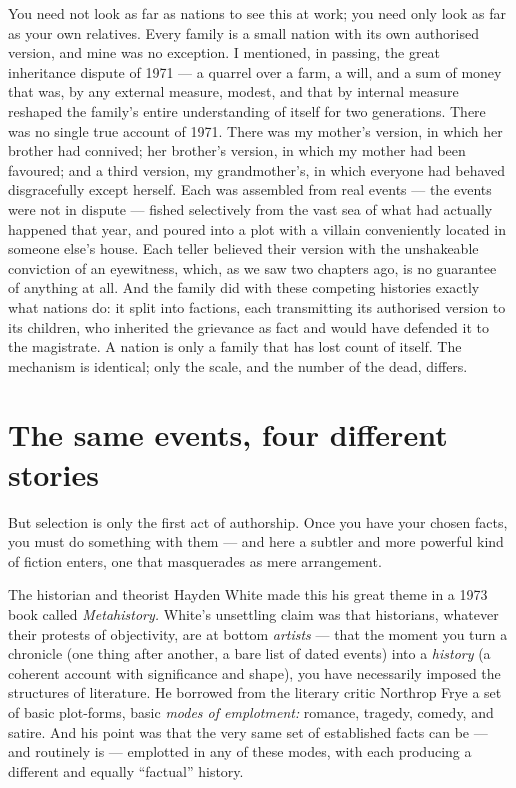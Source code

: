 You need not look as far as nations to see this at work; you need only look as far as your own relatives. Every family is a small nation with its own authorised version, and mine was no exception. I mentioned, in passing, the great inheritance dispute of 1971 — a quarrel over a farm, a will, and a sum of money that was, by any external measure, modest, and that by internal measure reshaped the family's entire understanding of itself for two generations. There was no single true account of 1971. There was my mother's version, in which her brother had connived; her brother's version, in which my mother had been favoured; and a third version, my grandmother's, in which everyone had behaved disgracefully except herself. Each was assembled from real events — the events were not in dispute — fished selectively from the vast sea of what had actually happened that year, and poured into a plot with a villain conveniently located in someone else's house. Each teller believed their version with the unshakeable conviction of an eyewitness, which, as we saw two chapters ago, is no guarantee of anything at all. And the family did with these competing histories exactly what nations do: it split into factions, each transmitting its authorised version to its children, who inherited the grievance as fact and would have defended it to the magistrate. A nation is only a family that has lost count of itself. The mechanism is identical; only the scale, and the number of the dead, differs.

\section*{The same events, four different stories}

But selection is only the first act of authorship. Once you have your chosen facts, you must do something with them — and here a subtler and more powerful kind of fiction enters, one that masquerades as mere arrangement.

The historian and theorist Hayden White made this his great theme in a 1973 book called \emph{Metahistory.} White's unsettling claim was that historians, whatever their protests of objectivity, are at bottom \emph{artists} — that the moment you turn a chronicle (one thing after another, a bare list of dated events) into a \emph{history} (a coherent account with significance and shape), you have necessarily imposed the structures of literature. He borrowed from the literary critic Northrop Frye a set of basic plot-forms, basic \emph{modes of emplotment:} romance, tragedy, comedy, and satire. And his point was that the very same set of established facts can be — and routinely is — emplotted in any of these modes, with each producing a different and equally ``factual'' history.

